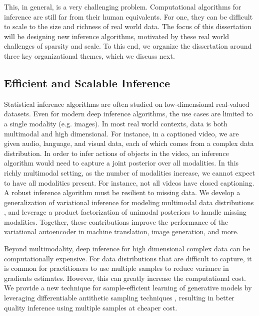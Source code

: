 This, in general, is a very challenging problem. Computational algorithms for inference are still far from their human equivalents. For one, they can be difficult to scale to the size and richness of real world data. The focus of this dissertation will be designing new inference algorithms, motivated by these real world challenges of sparsity and scale. To this end, we organize the dissertation around three key organizational themes, which we discuss next.

\subsection{Efficient and Scalable Inference}

Statistical inference algorithms are often studied on low-dimensional real-valued datasets. Even for modern deep inference algorithms, the use cases are limited to a single modality (e.g. images). In most real world contexts, data is both multimodal and high dimensional. For instance, in a captioned video, we are given audio, language, and visual data, each of which comes from a complex data distribution. In order to infer actions of objects in the video, an inference algorithm would need to capture a joint posterior over all modalities. In this richly multimodal setting, as the number of modalities increase, we cannot expect to have all modalities present. For instance, not all videos have closed captioning. A robust inference algorithm must be resilient to missing data. We develop a generalization of variational inference for modeling multimodal data distributions \cite{wu2018multimodal}, and leverage a product factorization of unimodal posteriors to handle missing modalities. Together, these contributions improve the performance of the variational autoencoder \cite{wu2018multimodal} in machine translation, image generation, and more.

Beyond multimodality, deep inference for high dimensional complex data can be computationally expensive. For data distributions that are difficult to capture, it is common for practitioners to use multiple samples to reduce variance in gradients estimates. However, this can greatly increase the computational cost. We provide a new technique \cite{wu2019differentiable} for sample-efficient learning of generative models by leveraging differentiable antithetic sampling techniques \cite{wu2019differentiable,ren2019adaptive}, resulting in better quality inference using multiple samples at cheaper cost.

